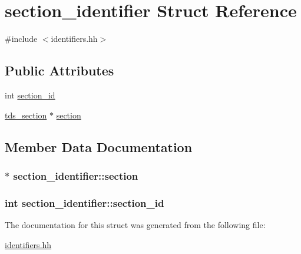 \hypertarget{structsection__identifier}{\section{section\-\_\-identifier Struct Reference}
\label{structsection__identifier}
}


{\ttfamily \#include $<$identifiers.\-hh$>$}

\subsection*{Public Attributes}
\begin{DoxyCompactItemize}
\item 
int \hyperlink{structsection__identifier_a09ca225eec6a949e98efb59687e6b4ca}{section\-\_\-id}
\item 
\hyperlink{classtds__section}{tds\-\_\-section} $\ast$ \hyperlink{structsection__identifier_a379de132baa2a9a5949decef3e4bb85e}{section}
\end{DoxyCompactItemize}


\subsection{Member Data Documentation}
\hypertarget{structsection__identifier_a379de132baa2a9a5949decef3e4bb85e}{
\subsubsection[{section}]{$\ast$ section\-\_\-identifier\-::section}}\label{structsection__identifier_a379de132baa2a9a5949decef3e4bb85e}
\hypertarget{structsection__identifier_a09ca225eec6a949e98efb59687e6b4ca}{
\subsubsection[{section\-\_\-id}]{\setlength{\rightskip}{0pt plus 5cm}int section\-\_\-identifier\-::section\-\_\-id}}\label{structsection__identifier_a09ca225eec6a949e98efb59687e6b4ca}


The documentation for this struct was generated from the following file\-:\begin{DoxyCompactItemize}
\item 
\hyperlink{identifiers_8hh}{identifiers.\-hh}\end{DoxyCompactItemize}
